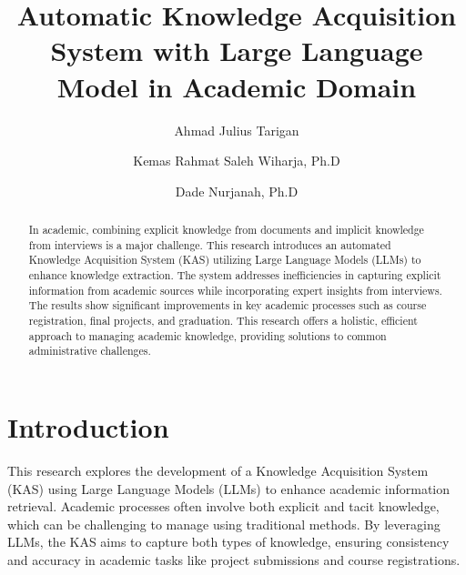 \documentclass[runningheads]{llncs}
\begin{document}
%
\title{Automatic Knowledge Acquisition System with Large Language Model in Academic Domain}
%
%
\author{Ahmad Julius Tarigan \and
Kemas Rahmat Saleh Wiharja, Ph.D \and
Dade Nurjanah, Ph.D}
%
%
%
\maketitle              %
%
\begin{abstract}
In academic, combining explicit knowledge from documents and implicit knowledge from interviews is a major challenge. This research introduces an automated Knowledge Acquisition System (KAS) utilizing Large Language Models (LLMs) to enhance knowledge extraction. The system addresses inefficiencies in capturing explicit information from academic sources while incorporating expert insights from interviews. The results show significant improvements in key academic processes such as course registration, final projects, and graduation. This research offers a holistic, efficient approach to managing academic knowledge, providing solutions to common administrative challenges.

\end{abstract}
%
%
%
\section{Introduction}
This research explores the development of a Knowledge Acquisition System (KAS) using Large Language Models (LLMs) to enhance academic information retrieval. Academic processes often involve both explicit and tacit knowledge, which can be challenging to manage using traditional methods. By leveraging LLMs, the KAS aims to capture both types of knowledge, ensuring consistency and accuracy in academic tasks like project submissions and course registrations.
\end{document}
